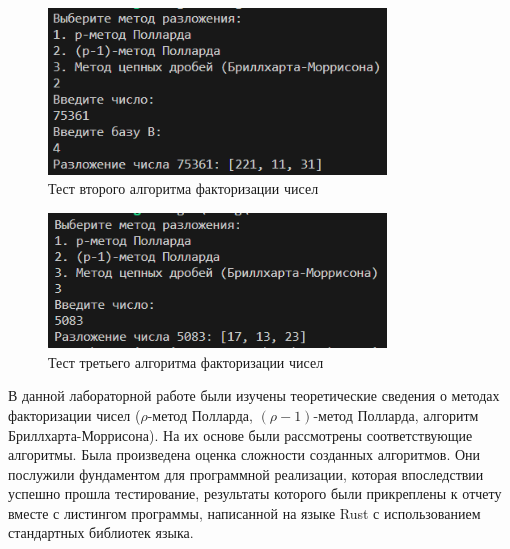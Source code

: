 \documentclass[bachelor, och, labwork]{shiza}
\begin{document}
        \begin{figure}[H]
            \centering
            \includegraphics[width=0.8\textwidth]{pic/2.png}
            \caption{Тест второго алгоритма факторизации чисел}
        \end{figure}

        \begin{figure}[H]
            \centering
            \includegraphics[width=0.8\textwidth]{pic/3.png}
            \caption{Тест третьего алгоритма факторизации чисел}
        \end{figure}

\conclusion

    В данной лабораторной работе были изучены теоретические сведения о методах
    факторизации чисел ($\rho$-метод Полларда, $(\rho-1)$-метод Полларда,
    алгоритм Бриллхарта-Моррисона). На их основе были рассмотрены
    соответствующие алгоритмы. Была произведена оценка сложности созданных
    алгоритмов. Они послужили фундаментом для программной реализации, которая
    впоследствии успешно прошла тестирование, результаты которого были
    прикреплены к отчету вместе с листингом программы, написанной на языке Rust
    с использованием стандартных библиотек языка.
\end{document}
